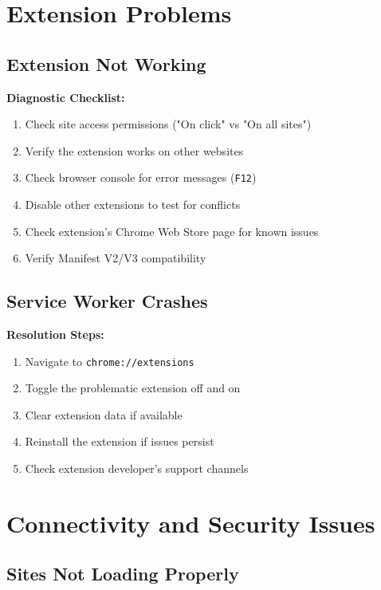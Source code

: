 \documentclass[11pt,a4paper,oneside]{book}
\newcommand{\keystroke}[1]{\texttt{\color{primaryblue}#1}}
\begin{document}
\section{Extension Problems}

\subsection{Extension Not Working}

\textbf{Diagnostic Checklist:}
\begin{enumerate}
    \item Check site access permissions ("On click" vs "On all sites")
    \item Verify the extension works on other websites
    \item Check browser console for error messages (\keystroke{F12})
    \item Disable other extensions to test for conflicts
    \item Check extension's Chrome Web Store page for known issues
    \item Verify Manifest V2/V3 compatibility
\end{enumerate}

\subsection{Service Worker Crashes}

\textbf{Resolution Steps:}
\begin{enumerate}
    \item Navigate to \keystroke{chrome://extensions}
    \item Toggle the problematic extension off and on
    \item Clear extension data if available
    \item Reinstall the extension if issues persist
    \item Check extension developer's support channels
\end{enumerate}

\section{Connectivity and Security Issues}

\subsection{Sites Not Loading Properly}
\end{document}
